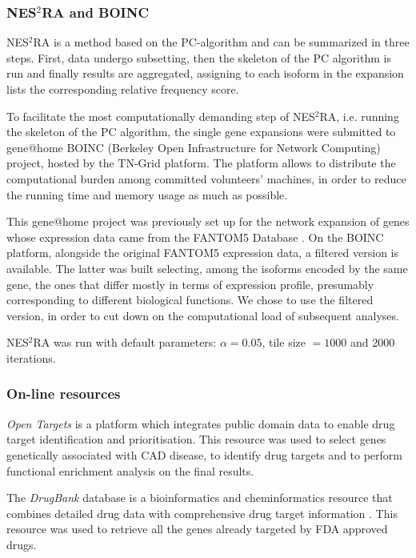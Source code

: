 \documentclass[fleqn,10pt]{SelfArx} %
\begin{document}
\subsubsection*{NES$^2$RA and BOINC}
NES$^2$RA is a method based on the PC-algorithm \cite{PC-alg} and can be summarized in three steps. First, data undergo subsetting, then the skeleton of the PC algorithm is run and finally results are aggregated, assigning to each isoform in the expansion lists the corresponding relative frequency score.

\setlength\emergencystretch{\textwidth}
To facilitate the most computationally demanding step of NES$^2$RA, i.e. running the skeleton of the PC algorithm, the single gene expansions were submitted to gene@home \cite{boinc, realBoinc} BOINC (Berkeley Open Infrastructure for Network Computing) project, hosted by the TN-Grid platform. The platform allows to distribute the computational burden among committed volunteers' machines, in order to reduce the running time and memory usage as much as possible.

This gene@home project was previously set up for the network expansion of genes whose expression data came from the FANTOM5 Database \cite{fantom}. On the BOINC platform, alongside the original FANTOM5 expression data, a filtered version is available. The latter was built selecting, among the isoforms encoded by the same gene, the ones that differ mostly in terms of expression profile, presumably corresponding to different biological functions. We chose to use the filtered version, in order to cut down on the computational load of subsequent analyses.

NES$^2$RA was run with default parameters: $\alpha=0.05$, tile size $=1000$ and 2000 iterations.

\subsubsection*{On-line resources}
\emph{Open Targets} is a platform which integrates public domain data to enable drug target identification and prioritisation\cite{open, OpenTargetPlatform}. This resource was used to select genes genetically associated with CAD disease, to identify drug targets and to perform functional enrichment analysis on the final results.

The \emph{DrugBank} database is a bioinformatics and cheminformatics resource that combines detailed drug data with comprehensive drug target information \cite{drugbank}. This resource was used to retrieve all the genes already targeted by FDA approved drugs.
\end{document}
